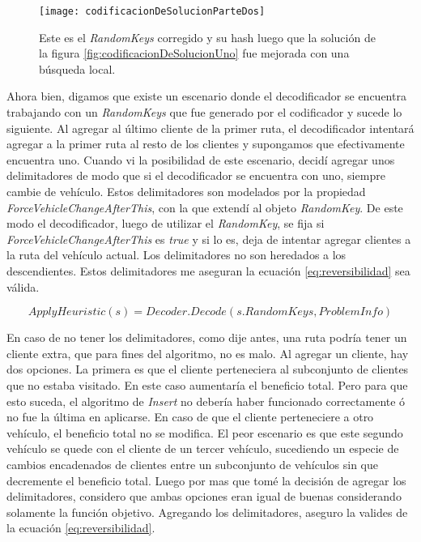 \begin{figure}[h]
    \caption{Este es el \textit{RandomKeys} corregido y su hash luego que la solución de la figura \ref{fig:codificacionDeSolucionUno} fue mejorada con una búsqueda local.}
    \centering
    \texttt{[image: codificacionDeSolucionParteDos]}
    \label{fig:codificacionDeSolucionDos}
\end{figure} 


\bigskip

Ahora bien, digamos que existe un escenario donde el decodificador se encuentra trabajando con un \textit{RandomKeys} que fue generado por el codificador y sucede lo siguiente. Al agregar al último cliente de la primer ruta, el decodificador intentará agregar a la primer ruta al resto de los clientes y supongamos que efectivamente encuentra uno. Cuando vi la posibilidad de este escenario, decidí agregar unos delimitadores de modo que si el decodificador se encuentra con uno, siempre cambie de vehículo. Estos delimitadores son modelados por la propiedad \textit{ForceVehicleChangeAfterThis}, con la que extendí al objeto \textit{RandomKey}. De este modo el decodificador, luego de utilizar el \textit{RandomKey}, se fija si \textit{ForceVehicleChangeAfterThis} es \textit{true} y si lo es, deja de intentar agregar clientes a la ruta del vehículo actual. Los delimitadores no son heredados a los descendientes. Estos delimitadores me aseguran la ecuación \ref{eq:reversibilidad} sea válida.

\begin{equation} \label{eq:reversibilidad}
ApplyHeuristic(s) = Decoder.Decode(s.RandomKeys, ProblemInfo)
\end{equation}

\bigskip

En caso de no tener los delimitadores, como dije antes, una ruta podría tener un cliente extra, que para fines del algoritmo, no es malo. Al agregar un cliente, hay dos opciones. La primera es que el cliente perteneciera al subconjunto de clientes que no estaba visitado. En este caso aumentaría el beneficio total. Pero para que esto suceda, el algoritmo de \textit{Insert} no debería haber funcionado correctamente ó no fue la última en aplicarse. En caso de que el cliente perteneciere a otro vehículo, el beneficio total no se modifica. El peor escenario es que este segundo vehículo se quede con el cliente de un tercer vehículo, sucediendo un especie de cambios encadenados de clientes entre un subconjunto de vehículos sin que decremente el beneficio total. Luego por mas que tomé la decisión de agregar los delimitadores, considero que ambas opciones eran igual de buenas considerando solamente la función objetivo. Agregando los delimitadores, aseguro la valides de la ecuación \ref{eq:reversibilidad}.

